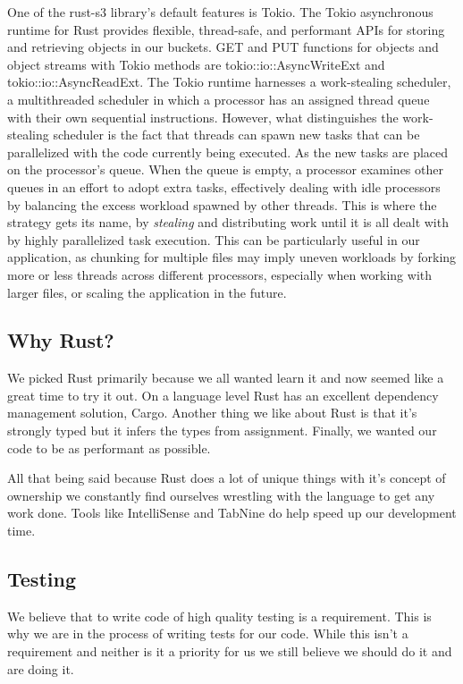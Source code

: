 \documentclass[conference]{IEEEtran}
\begin{document}
One of the rust-s3 library's default features is Tokio. The Tokio asynchronous runtime for Rust provides flexible, 
thread-safe, and performant APIs for storing and retrieving objects in our buckets. GET and PUT functions for objects
and object streams with Tokio methods are tokio::io::AsyncWriteExt and tokio::io::AsyncReadExt. The Tokio runtime harnesses
a work-stealing scheduler, a multithreaded scheduler in which a processor has an assigned thread queue with their own 
sequential instructions. However, what distinguishes the work-stealing scheduler is the fact that threads can spawn new tasks 
that can be parallelized with the code currently being executed. As the new tasks are placed on the processor's queue. When the 
queue is empty, a processor examines other queues in an effort to adopt extra tasks, effectively dealing with idle processors 
by balancing the excess workload spawned by other threads. This is where the strategy gets its name, by \textit{stealing} and
distributing work until it is all dealt with by highly parallelized task execution. This can be particularly useful in our 
application, as chunking for multiple files may imply uneven workloads by forking more or less threads across different processors, 
especially when working with larger files, or scaling the application in the future.


\subsection{Why Rust?}

We picked Rust primarily because we all wanted learn it and now seemed like a great time to try it out.
On a language level Rust has an excellent dependency management solution, Cargo.
Another thing we like about Rust is that it's strongly typed but it infers the types from assignment.
Finally, we wanted our code to be as performant as possible.

All that being said because Rust does a lot of unique things with it's concept of ownership we constantly
find ourselves wrestling with the language to get any work done.
Tools like IntelliSense and TabNine do help speed up our development time.

\subsection{Testing}

We believe that to write code of high quality testing is a requirement.
This is why we are in the process of writing tests for our code.
While this isn't a requirement and neither is it a priority for us we still believe we should do it and are doing it.
\end{document}
